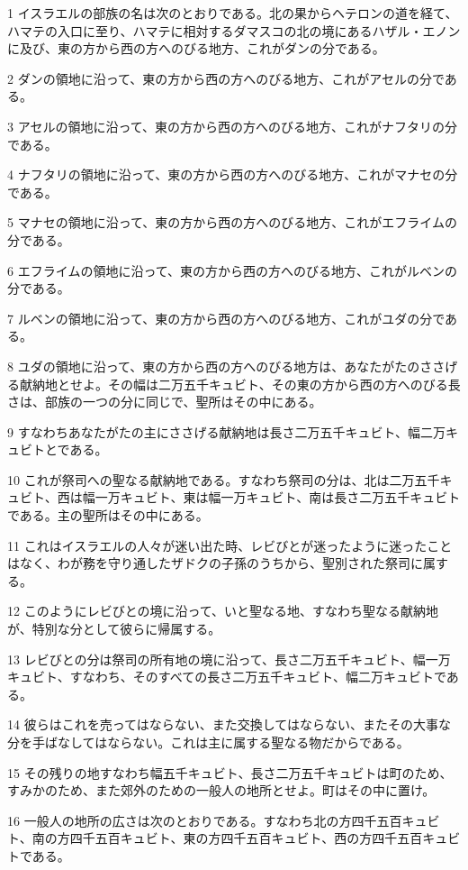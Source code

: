 \par 1 イスラエルの部族の名は次のとおりである。北の果からヘテロンの道を経て、ハマテの入口に至り、ハマテに相対するダマスコの北の境にあるハザル・エノンに及び、東の方から西の方へのびる地方、これがダンの分である。
\par 2 ダンの領地に沿って、東の方から西の方へのびる地方、これがアセルの分である。
\par 3 アセルの領地に沿って、東の方から西の方へのびる地方、これがナフタリの分である。
\par 4 ナフタリの領地に沿って、東の方から西の方へのびる地方、これがマナセの分である。
\par 5 マナセの領地に沿って、東の方から西の方へのびる地方、これがエフライムの分である。
\par 6 エフライムの領地に沿って、東の方から西の方へのびる地方、これがルベンの分である。
\par 7 ルベンの領地に沿って、東の方から西の方へのびる地方、これがユダの分である。
\par 8 ユダの領地に沿って、東の方から西の方へのびる地方は、あなたがたのささげる献納地とせよ。その幅は二万五千キュビト、その東の方から西の方へのびる長さは、部族の一つの分に同じで、聖所はその中にある。
\par 9 すなわちあなたがたの主にささげる献納地は長さ二万五千キュビト、幅二万キュビトとである。
\par 10 これが祭司への聖なる献納地である。すなわち祭司の分は、北は二万五千キュビト、西は幅一万キュビト、東は幅一万キュビト、南は長さ二万五千キュビトである。主の聖所はその中にある。
\par 11 これはイスラエルの人々が迷い出た時、レビびとが迷ったように迷ったことはなく、わが務を守り通したザドクの子孫のうちから、聖別された祭司に属する。
\par 12 このようにレビびとの境に沿って、いと聖なる地、すなわち聖なる献納地が、特別な分として彼らに帰属する。
\par 13 レビびとの分は祭司の所有地の境に沿って、長さ二万五千キュビト、幅一万キュビト、すなわち、そのすべての長さ二万五千キュビト、幅二万キュビトである。
\par 14 彼らはこれを売ってはならない、また交換してはならない、またその大事な分を手ばなしてはならない。これは主に属する聖なる物だからである。
\par 15 その残りの地すなわち幅五千キュビト、長さ二万五千キュビトは町のため、すみかのため、また郊外のための一般人の地所とせよ。町はその中に置け。
\par 16 一般人の地所の広さは次のとおりである。すなわち北の方四千五百キュビト、南の方四千五百キュビト、東の方四千五百キュビト、西の方四千五百キュビトである。
